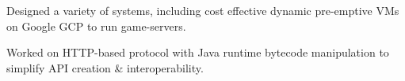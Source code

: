\documentclass[a4paper]{deedy-resume}
\begin{document}
\begin{minipage}[t]{0.66\textwidth}
\sectionspace



\begin{tightitemize}
\item Designed a variety of systems, including cost effective
	  dynamic pre-emptive VMs on Google GCP to run game-servers.
\item Worked on HTTP-based protocol with Java runtime bytecode
	  manipulation to simplify API creation \& interoperability.
\end{tightitemize}

\sectionspace

\end{minipage} %
\end{document}
